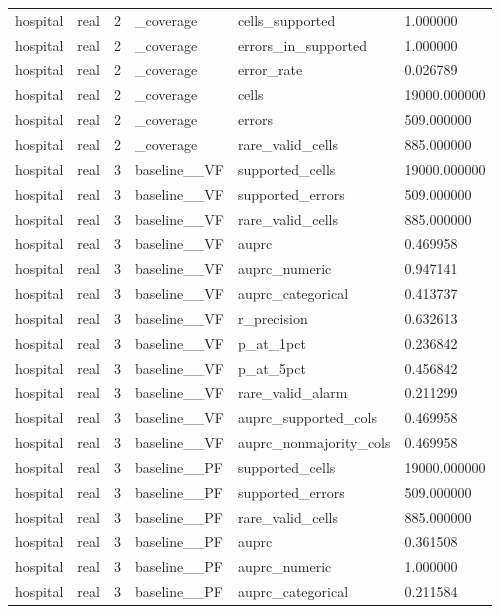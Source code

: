 \begin{tabular}{llllll}
hospital & real & 2 & \_coverage & cells\_supported & 1.000000 \\
hospital & real & 2 & \_coverage & errors\_in\_supported & 1.000000 \\
hospital & real & 2 & \_coverage & error\_rate & 0.026789 \\
hospital & real & 2 & \_coverage & cells & 19000.000000 \\
hospital & real & 2 & \_coverage & errors & 509.000000 \\
hospital & real & 2 & \_coverage & rare\_valid\_cells & 885.000000 \\
hospital & real & 3 & baseline\_\_VF & supported\_cells & 19000.000000 \\
hospital & real & 3 & baseline\_\_VF & supported\_errors & 509.000000 \\
hospital & real & 3 & baseline\_\_VF & rare\_valid\_cells & 885.000000 \\
hospital & real & 3 & baseline\_\_VF & auprc & 0.469958 \\
hospital & real & 3 & baseline\_\_VF & auprc\_numeric & 0.947141 \\
hospital & real & 3 & baseline\_\_VF & auprc\_categorical & 0.413737 \\
hospital & real & 3 & baseline\_\_VF & r\_precision & 0.632613 \\
hospital & real & 3 & baseline\_\_VF & p\_at\_1pct & 0.236842 \\
hospital & real & 3 & baseline\_\_VF & p\_at\_5pct & 0.456842 \\
hospital & real & 3 & baseline\_\_VF & rare\_valid\_alarm & 0.211299 \\
hospital & real & 3 & baseline\_\_VF & auprc\_supported\_cols & 0.469958 \\
hospital & real & 3 & baseline\_\_VF & auprc\_nonmajority\_cols & 0.469958 \\
hospital & real & 3 & baseline\_\_PF & supported\_cells & 19000.000000 \\
hospital & real & 3 & baseline\_\_PF & supported\_errors & 509.000000 \\
hospital & real & 3 & baseline\_\_PF & rare\_valid\_cells & 885.000000 \\
hospital & real & 3 & baseline\_\_PF & auprc & 0.361508 \\
hospital & real & 3 & baseline\_\_PF & auprc\_numeric & 1.000000 \\
hospital & real & 3 & baseline\_\_PF & auprc\_categorical & 0.211584 \\

\end{tabular}
